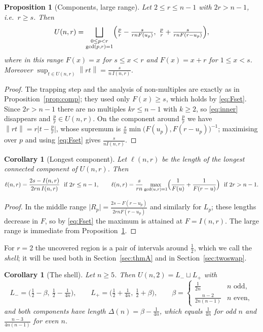 \documentclass[11pt]{article}
\newtheorem{proposition}[theorem]{Proposition}
\newtheorem{corollary}[theorem]{Corollary}
\theoremstyle{definition}
\newcommand{\norm}[1]{\left\lVert #1 \right\rVert}
\begin{document}
\begin{proposition}[Components, large range]\label{prop:complarge}
Let $2\le r\le n-1$ with $2r>n-1$, i.e.\ $r\ge s$. Then
\[
U(n,r)=\bigsqcup_{\substack{0\le p<r\\ \gcd(p,r)=1}}
\Bigl(\tfrac pr-\tfrac{s}{rnF(u_p)},\ \tfrac pr+\tfrac{s}{rnF(r-u_p)}\Bigr),
\]
where in this range $F(x)=x$ for $s\le x<r$ and $F(x)=x+r$ for
$1\le x<s$. Moreover $\sup_{t\in U(n,r)}\norm{rt}=\frac{s}{n\,I(n,r)}$.
\end{proposition}

\begin{proof}
The trapping step and the analysis of non-multiples are exactly as in
Proposition~\ref{prop:comp}; they used only $F(x)\ge s$, which holds by
\eqref{eq:Fset}. Since $2r>n-1$ there are no multiples $kr\le n-1$ with
$k\ge2$, so \eqref{eq:inner} disappears and $\frac pr\in U(n,r)$. On the
component around $\frac pr$ we have
$\norm{rt}=r\lvert t-\frac pr\rvert$, whose supremum is
$\frac sn\min\bigl(F(u_p),F(r-u_p)\bigr)^{-1}$; maximising over $p$ and
using \eqref{eq:Fset} gives $\frac{s}{nI(n,r)}$.
\end{proof}

\begin{corollary}[Longest component]\label{cor:length}
Let $\ell(n,r)$ be the length of the longest connected component of
$U(n,r)$. Then
\[
\ell(n,r)=\frac{2s-I(n,r)}{2rn\,I(n,r)}\ \ \text{if } 2r\le n-1,
\qquad
\ell(n,r)=\frac{s}{rn}\max_{\gcd(u,r)=1}
\Bigl(\frac1{F(u)}+\frac1{F(r-u)}\Bigr)\ \ \text{if } 2r>n-1 .
\]
\end{corollary}

\begin{proof}
In the middle range $\lvert R_p\rvert=\frac{2s-F(r-u_p)}{2rnF(r-u_p)}$
and similarly for $L_p$; these lengths decrease in $F$, so by
\eqref{eq:Fset} the maximum is attained at $F=I(n,r)$. The large range
is immediate from Proposition~\ref{prop:complarge}.
\end{proof}

For $r=2$ the uncovered region is a pair of intervals around
$\frac12$, which we call the \emph{shell}; it will be used both in
Section~\ref{sec:thmA} and in Section~\ref{sec:twoswap}.

\begin{corollary}[The shell]\label{cor:U2}
Let $n\ge5$. Then $U(n,2)=L_-\sqcup L_+$ with
\[
L_-=\bigl(\tfrac12-\beta,\ \tfrac12-\tfrac1{4n}\bigr),\qquad
L_+=\bigl(\tfrac12+\tfrac1{4n},\ \tfrac12+\beta\bigr),\qquad
\beta=\begin{cases}\frac1{2n}& n\text{ odd},\\[2pt]
\frac{n-2}{2n(n-1)}& n\text{ even},\end{cases}
\]
and both components have length
$\Delta(n)=\beta-\frac1{4n}$, which equals $\frac1{4n}$ for odd $n$
and $\frac{n-3}{4n(n-1)}$ for even $n$.
\end{corollary}
\end{document}
